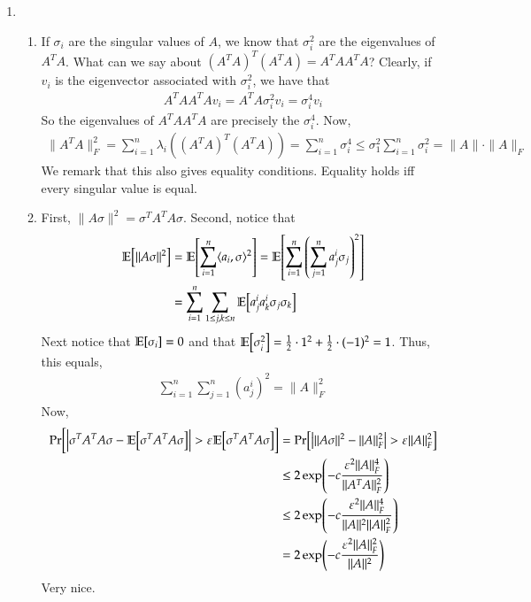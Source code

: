 \documentclass[12pt]{article}
\theoremstyle{definitionstyle}
\def \ve{\varepsilon}
\newcommand{\mg}[1]{\| #1 \|}
\renewcommand{\P}{\mathrm{Pr}\qty}
\newcommand{\E}{\mathbb{E}\qty}
\begin{document}
\begin{enumerate}[leftmargin=\labelsep]
		\item
		\begin{enumerate}
			\item If $\sigma_i$ are the singular values of $A$, we know that $\sigma_i^2$ are the eigenvalues of $A^TA$. What can we say about $(A^TA)^T (A^TA) = A^TAA^TA$? Clearly, if $v_i$ is the eigenvector associated with $\sigma_i^2$, we have that
			\begin{align*}
				A^TAA^TA v_i = A^TA \sigma_i^2 v_i = \sigma_i^4 v_i
			\end{align*}
			So the eigenvalues of $A^TAA^TA$ are precisely the $\sigma_i^4$. Now,
			\begin{align*}
				\mg{A^TA}_F^2 = \sum_{i=1}^n \lambda_i((A^TA)^T(A^TA)) = \sum_{i=1}^n \sigma_i^4 \leq \sigma_1^2 \sum_{i=1}^n \sigma_i^2 = \mg{A} \cdot \mg{A}_F
			\end{align*}
			We remark that this also gives equality conditions. Equality holds iff every singular value is equal.
		
			\item First, $\mg{A\sigma}^2 = \sigma^T A^T A \sigma$. Second, notice that
			\begin{align*}
				\E[\mg{A\sigma}^2] &= \E[\sum_{i=1}^n \langle a_i, \sigma \rangle^2] = \E[\sum_{i=1}^n \qty(\sum_{j=1}^n a_j^i \sigma_j)^2] \\
				&= \sum_{i=1}^n \sum_{1 \leq j, k \leq n} \E[a_j^i a_k^i \sigma_j \sigma_k]
			\end{align*}
			Next notice that $\E[\sigma_i] = 0$ and that $\E[\sigma_i^2] = \frac12 \cdot 1^2 + \frac12 \cdot (-1)^2 = 1$. Thus, this equals,
			\begin{align*}
				\sum_{i=1}^n \sum_{j=1}^n (a_j^i)^2 = \mg{A}_F^2
			\end{align*}
			Now,
			\begin{align*}
				\P[\qty|\sigma^T A^T A \sigma - \E[\sigma^T A^TA\sigma]| > \ve \E[\sigma^T A^TA\sigma]] &= \P[\qty|\mg{A\sigma}^2 - \mg{A}_F^2| > \ve \mg{A}_F^2] \\ &\leq 2\exp(-c\frac{\ve^2 \mg{A}_F^4}{\mg{A^TA}_F^2}) \\
				&\leq 2\exp(-c\frac{\ve^2 \mg{A}_F^4}{\mg{A}^2 \mg{A}_F^2}) \\
				&= 2\exp(-c \frac{\ve^2 \mg{A}_F^2}{\mg{A}^2})
			\end{align*}
			Very nice.
			

\end{enumerate}
\end{enumerate}
\end{document}
